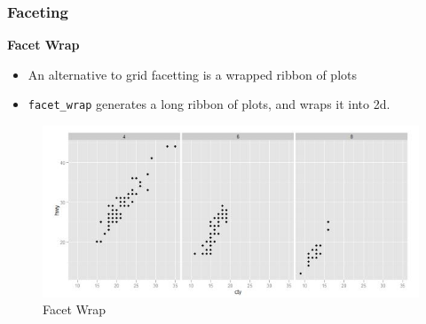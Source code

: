 \documentclass{beamer}
\begin{document}
\begin{frame}
	\frametitle{Faceting}
\Large

\noindent \textbf{Facet Wrap}
\begin{itemize}
\item An alternative to grid facetting is a wrapped ribbon of plots
\item \texttt{facet\_wrap} generates a long ribbon of plots, and wraps it into 2d.
\end{itemize}

\end{frame}

\begin{frame}
	\begin{figure}
\centering
\includegraphics[width=1.1\linewidth]{FacetWrap}
\caption{Facet Wrap}
\label{fig:FacetWrap}
\end{figure}

\end{frame}
\end{document}
